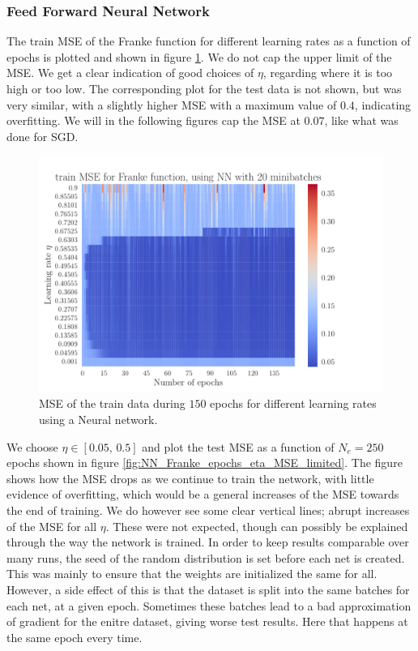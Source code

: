 \documentclass[12pt]{extarticle}
\begin{document}
\subsubsection{Feed Forward Neural Network}

The train MSE of the Franke function for different learning rates as a function of epochs is plotted and shown in figure \ref{fig:NN_Franke_epochs_eta_MSE}. We do not cap the upper limit of the MSE. We get a clear indication of good choices of $\eta$, regarding where it is too high or too low. The corresponding plot for the test data is not shown, but was very similar, with a slightly higher MSE with a maximum value of $0.4$, indicating overfitting. We will in the following figures cap the MSE at $0.07$, like what was done for SGD.

\begin{figure}[h!]
	\includegraphics[width=\linewidth]{NN_Franke/NN_Franke__epochs_eta__train_MSE__569887.pdf}
	\caption{MSE of the train data during $150$ epochs for different learning rates using a Neural network.}
	\label{fig:NN_Franke_epochs_eta_MSE}
\end{figure}


We choose $\eta\in[0.05,\,0.5]$ and plot the test MSE as a function of $N_e=250$ epochs shown in figure \ref{fig:NN_Franke_epochs_eta_MSE_limited}. The figure shows how the MSE drops as we continue to train the network, with little evidence of overfitting, which would be a general increases of the MSE towards the end of training. We do however see some clear vertical lines; abrupt increases of the MSE for all $\eta$. These were not expected, though can possibly be explained through the way the network is trained. In order to keep results comparable over many runs, the seed of the random distribution is set before each net is created. This was mainly to ensure that the weights are initialized the same for all. However, a side effect of this is that the dataset is split into the same batches for each net, at a given epoch. Sometimes these batches lead to a bad approximation of gradient for the enitre dataset, giving worse test results. Here that happens at the same epoch every time.
\end{document}

